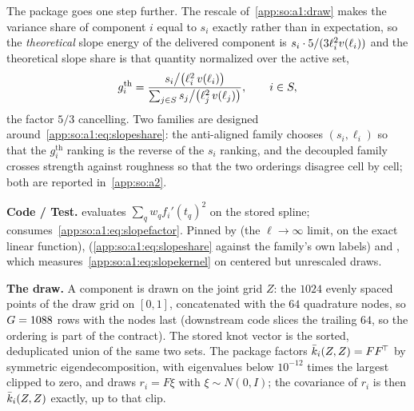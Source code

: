 The package goes one step further. The rescale of~\ref{app:so:a1:draw} makes
the variance share of component $i$ equal to $s_i$ exactly rather than in
expectation, so the \emph{theoretical} slope energy of the delivered component
is $s_i\cdot 5/(3\ell_i^2v(\ell_i))$ and the theoretical slope share is
that quantity normalized over the active set,
\begin{equation}\label{app:so:a1:eq:slopeshare}
  g_i^{\mathrm{th}}
  =\frac{s_i\big/\bigl(\ell_i^2\,v(\ell_i)\bigr)}
        {\sum_{j\in S}s_j\big/\bigl(\ell_j^2\,v(\ell_j)\bigr)},
  \qquad i\in S,
\end{equation}
the factor $5/3$ cancelling. Two families are designed
around~\eqref{app:so:a1:eq:slopeshare}: the anti-aligned family chooses
$(s_i,\ell_i)$ so that the $g_i^{\mathrm{th}}$ ranking is the reverse of the
$s_i$ ranking, and the decoupled family crosses strength against roughness so
that the two orderings disagree cell by cell; both are reported
in~\ref{app:so:a2}.

\begin{sloppypar}
\textbf{Code / Test.}  evaluates $\sum_q w_q
{f_i'(t_q)}^2$ on the stored spline; 
consumes~\eqref{app:so:a1:eq:slopefactor}. Pinned by
 (the
$\ell\to\infty$ limit, on the exact linear function),
(\eqref{app:so:a1:eq:slopeshare} against the family's own labels) and
, which
measures~\eqref{app:so:a1:eq:slopekernel} on centered but unrescaled draws.
\end{sloppypar}

\label{app:so:a1:draw}

\textbf{The draw.} A component is drawn on the joint grid $Z$: the $1024$
evenly spaced points of the draw grid on $[0,1]$, concatenated with the $64$
quadrature nodes, so $G=1088$ rows with the nodes last
(downstream code slices the trailing $64$, so the ordering is part of the
contract). The stored knot vector is the sorted, deduplicated union of the
same two sets. The package factors $\bar k_i(Z,Z)=FF^{\!\top}$ by symmetric
eigendecomposition, with eigenvalues below $10^{-12}$ times the largest
clipped to zero, and draws $r_i=F\xi$ with $\xi\sim N(0,I)$; the covariance of
$r_i$ is then $\bar k_i(Z,Z)$ exactly, up to that clip.


